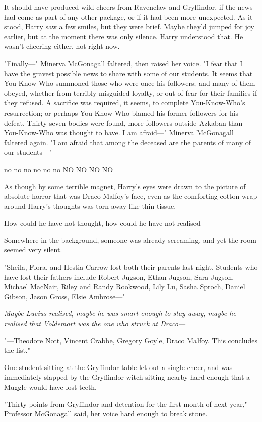 It should have produced wild cheers from Ravenclaw and Gryffindor, if the news
had come as part of any other package, or if it had been more unexpected. As it
stood, Harry saw a few smiles, but they were brief. Maybe they'd jumped for joy
earlier, but at the moment there was only silence. Harry understood that. He
wasn't cheering either, not right now.

"Finally---" Minerva McGonagall faltered, then raised her voice. "I fear that I
have the gravest possible news to share with some of our students. It seems
that You-Know-Who summoned those who were once his followers; and many of them
obeyed, whether from terribly misguided loyalty, or out of fear for their
families if they refused. A sacrifice was required, it seems, to complete
You-Know-Who's resurrection; or perhaps You-Know-Who blamed his former
followers for his defeat. Thirty-seven bodies were found, more followers
outside Azkaban than You-Know-Who was thought to have. I am afraid---" Minerva
McGonagall faltered again. "I am afraid that among the deceased are the parents
of many of our students---"

no no no no no no NO NO NO NO

As though by some terrible magnet, Harry's eyes were drawn to the picture of
absolute horror that was Draco Malfoy's face, even as the comforting cotton
wrap around Harry's thoughts was torn away like thin tissue.

How could he have not thought, how could he have not realised---

Somewhere in the background, someone was already screaming, and yet the room
seemed very silent.

"Sheila, Flora, and Hestia Carrow lost both their parents last night. Students
who have lost their fathers include Robert Jugson, Ethan Jugson, Sara Jugson,
Michael MacNair, Riley and Randy Rookwood, Lily Lu, Sasha Sproch, Daniel
Gibson, Jason Gross, Elsie Ambrose---"

\emph{Maybe Lucius realised, maybe he was smart enough to stay away, maybe he
realised that Voldemort was the one who struck at Draco---}

"---Theodore Nott, Vincent Crabbe, Gregory Goyle, Draco Malfoy. This concludes
the list."

One student sitting at the Gryffindor table let out a single cheer, and was
immediately slapped by the Gryffindor witch sitting nearby hard enough that a
Muggle would have lost teeth.

"Thirty points from Gryffindor and detention for the first month of next year,"
Professor McGonagall said, her voice hard enough to break stone.

